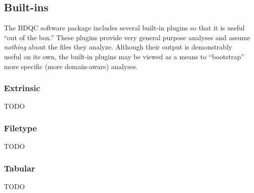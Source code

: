 \documentclass {article}
\begin{document}
\subsection{Built-ins}
The BDQC software package includes several built-in plugins so that it is
useful ``out of the box.'' These plugins provide very general purpose analyses
and assume \emph{nothing} about the files they analyze.
Although their output is demonstrably useful on its own, the built-in plugins
may be viewed as a means to ``bootstrap'' more specific (more domain-aware)
analyses.
\subsubsection{Extrinsic}
TODO
\subsubsection{Filetype}
TODO
\subsubsection{Tabular}
TODO



\end{document}
